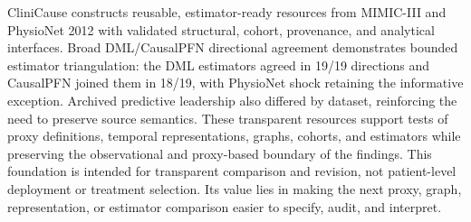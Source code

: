 \documentclass[letterpaper]{article}
\begin{document}
CliniCause constructs reusable, estimator-ready resources from MIMIC-III and
PhysioNet 2012 with validated structural, cohort, provenance, and analytical
interfaces. Broad DML/CausalPFN directional agreement demonstrates bounded
estimator triangulation: the DML estimators agreed in 19/19 directions and
CausalPFN joined them in 18/19, with PhysioNet shock retaining the informative
exception. Archived predictive leadership also differed by dataset, reinforcing
the need to preserve source semantics. These transparent resources support tests
of proxy definitions, temporal representations, graphs, cohorts, and estimators
while preserving the observational and proxy-based boundary of the findings.
This foundation is intended for transparent comparison and revision, not
patient-level deployment or treatment selection. Its value lies in making the
next proxy, graph, representation, or estimator comparison easier to specify,
audit, and interpret.



\end{document}
